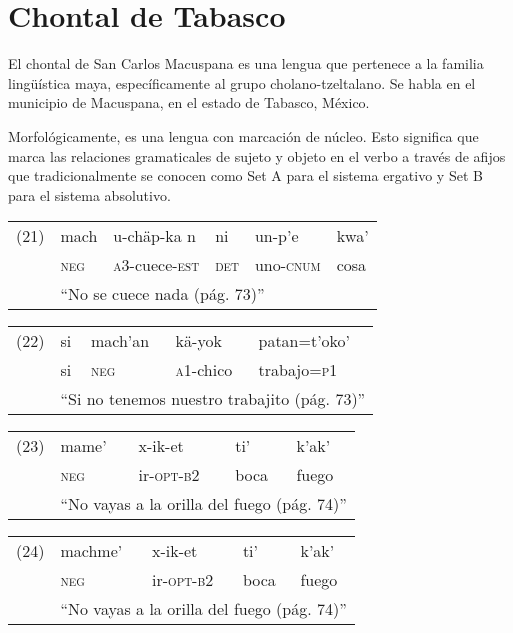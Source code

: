 \section*{Chontal de Tabasco}

\noindent El chontal de San Carlos Macuspana es una lengua que pertenece a la familia lingüística maya, específicamente al grupo cholano-tzeltalano. Se habla en el municipio de Macuspana, en el estado de Tabasco, México.

Morfológicamente, es una lengua con marcación de núcleo. Esto significa que marca las relaciones gramaticales de sujeto y objeto en el verbo a través de afijos que tradicionalmente se conocen como Set A para el sistema ergativo y Set B para el sistema absolutivo.\vspace{0.5cm}

{\setmainfont{Doulos SIL} 
\begin{tabular}{llllll}
(21) & mach & u-chäp-ka n& ni & un-p'e & kwa' \\
& \textsc{neg} & \textsc{a3}-cuece-\textsc{est} & \textsc{det} & uno-\textsc{cnum} & cosa \\
& \multicolumn{5}{l}{``No se cuece nada (pág. 73)''} \\
\end{tabular} \vspace{0.3cm}

\begin{tabular}{lllll}
(22) & si & mach'an & kä-yok  & patan=t'oko'\\
& si & \textsc{neg} & \textsc{a1}-chico & trabajo=\textsc{p1}\\
& \multicolumn{4}{l}{``Si no tenemos nuestro trabajito (pág. 73)''} \\
\end{tabular} \vspace{0.3cm}

\begin{tabular}{lllll}
(23) & mame' & x-ik-et & ti' & k'ak' \\
& \textsc{neg} & ir-\textsc{opt-b2} & boca & fuego\\
& \multicolumn{4}{l}{``No vayas a la orilla del fuego (pág. 74)''} \\
\end{tabular} \vspace{0.3cm}

\begin{tabular}{lllll}
(24) & machme' & x-ik-et & ti' & k'ak' \\
& \textsc{neg} & ir-\textsc{opt-b2} & boca & fuego\\
& \multicolumn{4}{l}{``No vayas a la orilla del fuego (pág. 74)''} \\
\end{tabular} \vspace{0.3cm}

}

